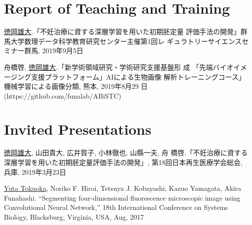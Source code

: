 \documentclass[letterpaper]{article}
\renewenvironment{itemize}{
  \begin{list}{}{
    \setlength{\leftmargin}{1.5em}
  }
}{
  \end{list}
}
\begin{document}




\section*{\bf Report of Teaching and Training}
\vspace{-0.6cm}
\hrulefill

\begin{itemize}
 \item \underline{徳岡雄大}.「不妊治療に資する深層学習を用いた初期胚定量
       評価手法の開発」群馬大学数理データ科学教育研究センター主催第1回レ
       ギュラトリーサイエンスセミナー群馬, 2019年9月5日
 \item 舟橋啓, \underline{徳岡雄大}.「新学術領域研究・学術研究支援基盤形
       成 「先端バイオイメージング支援プラットフォーム」AIによる生物画像
       解析トレーニングコース」機械学習による画像分類, 熊本, 2019年8月29
       日 \\ (https://github.com/funalab/ABiSTC) \\
\end{itemize}


\section*{\bf Invited Presentations}
\vspace{-0.6cm}
\hrulefill

\begin{itemize}
 \item \underline{徳岡雄大}, 山田貴大, 広井賀子, 小林徹也, 山縣一夫, 舟
       橋啓.「不妊治療に資する深層学習を用いた初期胚定量評価手法の開発」,
       第18回日本再生医療学会総会, 兵庫, 2019年3月23日
 \item \underline{Yuta Tokuoka}, Noriko F. Hiroi, Tetsuya J. Kobayashi,
       Kazuo Yamagata, Akira Funahashi. ``Segmenting four-dimensional
       fluorescence microscopic image using Convolutional Neural
       Network,'' 18th International Conference on Systems Biology,
       Blacksburg, Virginia, USA, Aug, 2017 \\
\end{itemize}
\end{document}
